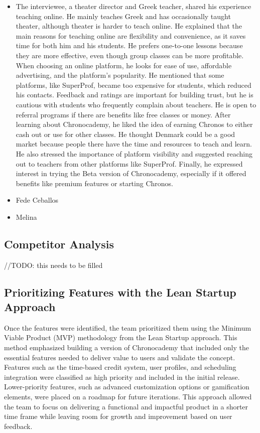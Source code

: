 \begin{itemize}
    \item The interviewee, a theater director and Greek teacher, shared his experience teaching online.
    He mainly teaches Greek and has occasionally taught theater, although theater is harder to teach online.
    He explained that the main reasons for teaching online are flexibility and convenience, as it saves time for both him and his students.
    He prefers one-to-one lessons because they are more effective, even though group classes can be more profitable.
    When choosing an online platform, he looks for ease of use, affordable advertising, and the platform’s popularity.
    He mentioned that some platforms, like SuperProf, became too expensive for students, which reduced his contacts.
    Feedback and ratings are important for building trust, but he is cautious with students who frequently complain about teachers.
    He is open to referral programs if there are benefits like free classes or money.
    After learning about Chronocademy, he liked the idea of earning Chronos to either cash out or use for other classes.
    He thought Denmark could be a good market because people there have the time and resources to teach and learn.
    He also stressed the importance of platform visibility and suggested reaching out to teachers from other platforms like SuperProf.
    Finally, he expressed interest in trying the Beta version of Chronocademy, especially if it offered benefits like premium features or starting Chronos.
    \item Fede Ceballos
    \item Melina
\end{itemize}


\subsection{Competitor Analysis}\label{subsec:competitor-analysis}
//TODO: this needs to be filled

\subsection{Prioritizing Features with the Lean Startup Approach}\label{subsec:prioritizing-features-with-the-lean-startup-approach}
Once the features were identified, the team prioritized them using the Minimum Viable Product (MVP) methodology from the Lean Startup approach.
This method emphasized building a version of Chronocademy that included only the essential features needed to deliver value to users and validate the concept.
Features such as the time-based credit system, user profiles, and scheduling integration were classified as high priority and included in the initial release.
Lower-priority features, such as advanced customization options or gamification elements, were placed on a roadmap for future iterations.
This approach allowed the team to focus on delivering a functional and impactful product in a shorter time frame while leaving room for growth and improvement based on user feedback.
